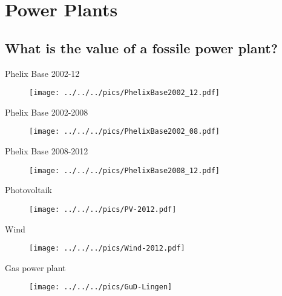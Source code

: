 \section{Power Plants}
\subsection{What is the value of a fossile power plant?}

{Phelix Base 2002-12}
\begin{figure}[htp]
\centering
\texttt{[image: ../../../pics/PhelixBase2002\_12.pdf]}
\end{figure}


{Phelix Base 2002-2008}
\begin{figure}[htp]
\centering
\texttt{[image: ../../../pics/PhelixBase2002\_08.pdf]}

\end{figure}


{Phelix Base 2008-2012}
\begin{figure}[htp]
\centering
\texttt{[image: ../../../pics/PhelixBase2008\_12.pdf]}

\end{figure}


{Photovoltaik}
\begin{figure}[htp]
\centering
\texttt{[image: ../../../pics/PV-2012.pdf]}
\label{prices}
\end{figure}

{Wind}
\begin{figure}[htp]
\centering
\texttt{[image: ../../../pics/Wind-2012.pdf]}
\label{prices}
\end{figure}

{Gas power plant}
\begin{figure}[htp]
\centering
\texttt{[image: ../../../pics/GuD-Lingen]}
\label{prices}
\end{figure}

